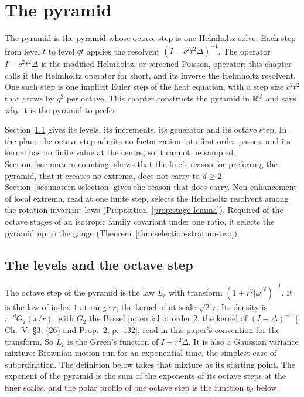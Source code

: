 \chapter{The \Matern{} pyramid}
\label{ch:matern}

The \Matern{} pyramid is the pyramid whose octave step is one Helmholtz solve. Each step from level
$t$ to level $qt$ applies the resolvent $(I - c^2t^2\Delta)^{-1}$. The operator $I - c^2t^2\Delta$ is
the modified Helmholtz, or screened Poisson, operator; this chapter calls it the Helmholtz operator
for short, and its inverse the Helmholtz resolvent. One such step is one implicit Euler step of the
heat equation, with a step size $c^2t^2$ that grows by $q^2$ per octave. This chapter constructs
the pyramid in $\mathbb{R}^d$ and says why it is the pyramid to prefer.

Section~\ref{sec:matern-levels} gives its levels, its increments, its generator and its octave
step. In the plane the octave step admits no factorization into first-order passes, and its kernel
has no finite value at the centre, so it cannot be sampled. Section~\ref{sec:matern-counting} shows
that the line's reason for preferring the pyramid, that it creates no extrema, does not carry to
$d \ge 2$. Section~\ref{sec:matern-selection} gives the reason that does carry. Non-enhancement of
local extrema, read at one finite step, selects the Helmholtz resolvent among the rotation-invariant
laws (Proposition~\ref{prop:stage-lemma}). Required of the octave stages of an isotropic family
covariant under one ratio, it selects the \Matern{} pyramid up to the gauge
(Theorem~\ref{thm:selection-stratum-two}).

\section{The levels and the octave step}
\label{sec:matern-levels}

The octave step of the \Matern{} pyramid is the law $L_r$ with transform $(1 + r^2|\omega|^2)^{-1}$.
It is the \Matern{} law of index $1$ at range $r$, the kernel of
 at scale $\sqrt2\,r$. Its density is $r^{-d}G_2(x/r)$, with
$G_2$ the Bessel potential of order $2$, the kernel of $(I - \Delta)^{-1}$
[, Ch.~V, \S 3, (26) and Prop.~2, p.~132], read in this paper's
convention for the transform. So $L_r$ is the Green's function of $I - r^2\Delta$. It is also a
Gaussian variance mixture: Brownian motion run for an exponential time, the simplest case of
subordination. The definition below takes that mixture as its starting point. The exponent of the
\Matern{} pyramid is the sum of the exponents of its octave steps at the finer scales, and the
polar profile of one octave step is the function $b_d$ below.

